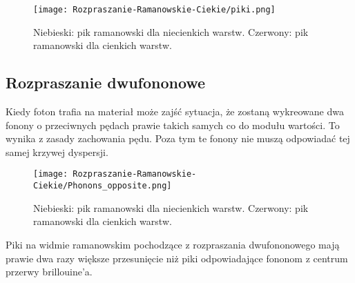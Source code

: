 \begin{figure}[H]
	\begin{center}
		\texttt{[image: Rozpraszanie-Ramanowskie-Ciekie/piki.png]}
		\caption{Niebieski: pik ramanowski dla niecienkich warstw. Czerwony: pik ramanowski dla cienkich warstw.}
	\end{center}
\end{figure}

\subsection{Rozpraszanie dwufononowe}
Kiedy foton trafia na materiał może zajść sytuacja, że zostaną wykreowane dwa fonony o przeciwnych pędach prawie takich samych co do modułu wartości. To wynika z zasady zachowania pędu. Poza tym te fonony nie muszą odpowiadać tej samej krzywej dyspersji. 
 
\begin{figure}[H]
	\begin{center}
		\texttt{[image: Rozpraszanie-Ramanowskie-Ciekie/Phonons\_opposite.png]}
		\caption{Niebieski: pik ramanowski dla niecienkich warstw. Czerwony: pik ramanowski dla cienkich warstw.}
	\end{center}
\end{figure}

Piki na widmie ramanowskim pochodzące z rozpraszania dwufononowego mają prawie dwa razy większe przesunięcie niż piki odpowiadające fononom z centrum przerwy brillouine'a. 
